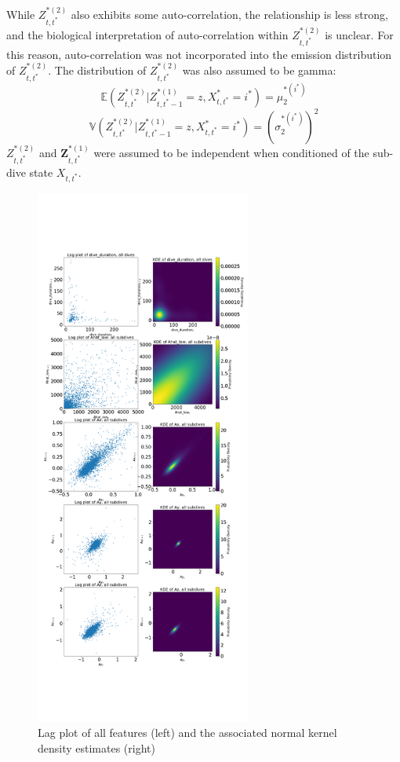 While $Z^{*(2)}_{t,t^*}$ also exhibits some auto-correlation, the relationship is less strong, and the biological interpretation of auto-correlation within $Z^{*(2)}_{t,t^*}$ is unclear. For this reason, auto-correlation was not incorporated into the emission distribution of $Z^{*(2)}_{t,t^*}$. The distribution of $Z^{*(2)}_{t,t^*}$ was also assumed to be gamma:
%
$$\mathbb{E}(Z^{*(2)}_{t,t^*}|Z^{*(1)}_{t,t^*-1} = z,X^*_{t,t^*} = i^*) = \mu_2^{*(i^*)}$$
$$\mathbb{V}(Z^{*(2)}_{t,t^*}|Z^{*(1)}_{t,t^*-1} = z,X^*_{t,t^*} = i^*) = (\sigma_2^{*(i^*)})^2$$
%
$Z^{*(2)}_{t,t^*}$ and $\mathbf{Z}^{*(1)}_{t,t^*}$ were assumed to be independent when conditioned of the sub-dive state $X_{t,t^*}$.

\begin{figure}[ht]
	\centering
	\includegraphics[height=7in]{../Plots/lagplot.png}
	\caption{Lag plot of all features (left) and the associated normal kernel density estimates (right)}
	\label{fig:lag}
\end{figure}

